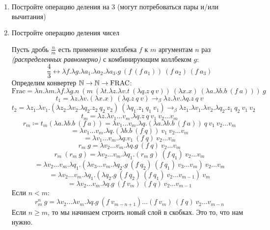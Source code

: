\begin{enumerate}
\begin{enumerate}
\begin{solution}
                    \end{solution}
              \item Постройте операцию деления на 3 (могут потребоваться пары и/или вычитания)
                    \begin{solution}
                    \end{solution}
              \item Постройте операцию деления чисел
                    \begin{solution}
                        Пусть дробь \(\frac{n}{m}\) есть применение коллбека \(f\) к \(m\) аргументам \(n\) раз \textit{(распределенных равномерно)} с комбинирующим коллбеком \(g\):
                        \[\frac{4}{3} \leftrightarrow \lambda f.\lambda g.\lambda a_1.\lambda a_2.\lambda a_3.g\ (f\ (f\ a_1))\ (f\ a_2)\ (f\ a_3)\]
                        Определим конвертер \(\mathbb{N} \to \mathbb{N} \to \mathrm{FRAC}\):
                        \[\mathrm{Frac} = \lambda n.\lambda m.\lambda f.\lambda g.n\ (m\ (\lambda t.\lambda z.\lambda v.t\ (\lambda q.z\ q\ v))\ (\lambda x.x)\ (\lambda a.\lambda b.b\ (f\ a)))\ g\]
                        \[t_1 = \lambda z.\lambda v.(\lambda x.x)\ (\lambda q.z\ q\ v) \to_\beta \lambda z.\lambda v.\lambda q.z\ q\ v\]
                        \[t_2 = \lambda z_1.\lambda v_1.(\lambda z_2.\lambda v_2.\lambda q_2.z_2\ q_2\ v_2)\ (\lambda q_1.z_1\ q_1\ v_1) \to_\beta \lambda z_1.\lambda v_1.\lambda v_2.\lambda q_2.z_1\ q_2\ v_1\ v_2\]
                        \[t_m = \lambda z.\lambda v_1\dots v_m.\lambda q.z\ q\ v_1\ v_2 \dots v_m\]
                        \[r_m \coloneqq t_m (\lambda a.\lambda b.b\ (f\ a)) = \lambda v_1\dots v_m.\lambda q.(\lambda a.\lambda b.b\ (f\ a))\ q\ v_1\ v_2 \dots v_m\]
                        \[ = \lambda v_1\dots v_m.\lambda q.(\lambda b.b\ (f\ q))\ v_1\ v_2 \dots v_m\]
                        \[ = \lambda v_1\dots v_m.\lambda q.v_1\ (f\ q)\ v_2 \dots v_m\]
                        \[r_m\ g = \lambda v_2 \dots v_m.\lambda q.g\ (f\ q)\ v_2 \dots v_m\]
                        \[r_m\ (r_m\ g) = \lambda v_2 \dots v_m.\lambda q_1.(r_m\ g)\ (f\ q_1)\ v_2 \dots v_m\]
                        \[= \lambda v_2 \dots v_m.\lambda q_1.(\lambda v_3 \dots v_m.\lambda q_2.g\ (f\ q_2)\ (f\ q_1)\ v_3 \dots v_m)\ v_2 \dots v_m\]
                        \[= \lambda v_2 \dots v_m.\lambda q_1.(\lambda q_2.g\ (f\ q_2)\ (f\ q_1)\ v_2 \dots v_{m - 1})\ v_m\]
                        \[= \lambda v_2 \dots v_m.\lambda q.g\ (f\ v_m)\ (f\ q)\ v_2 \dots v_{m - 1}\]
                        Если \(n < m\):
                        \[r_m^n\ g = \lambda v_2 \dots \lambda v_m.\lambda q.g\ (f\ v_{m - n + 1}) \dots (f\ v_m)\ (f\ q)\ v_2 \dots v_{m - n}\]
                        Если \(n \geq m\), то мы начинаем строить новый слой в скобках. Это то, что нам нужно.


\end{solution}
\end{enumerate}
\end{enumerate}
